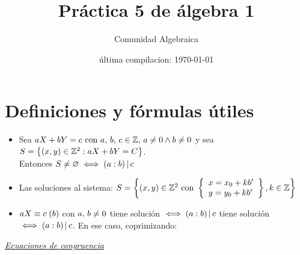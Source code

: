 




\title{Práctica 5 de álgebra 1} %
\author{Comunidad Algebraica} %
\date{última compilacion: \today} %

\maketitle  %

\section{Definiciones y fórmulas útiles}

\def\mcd{(a:b)}

\begin{itemize}
	\item Sea $aX + bY = c \text{ con } a,\, b,\, c \en \enteros,\, a \distinto 0 \y b \distinto 0$ y sea
	      $S = \set{ (x,y) \en \enteros^2 : aX + bY = C }$.\\
	      Entonces $S \distinto \vacio \sisolosi (a:b) \divideA c$

	\item Las soluciones al sistema: $S = \set{(x,y) \en \enteros^2 \text{ con }
			      \llaves{l}{
				      x = x_0 + kb'\\
				      y = y_0 + kb'
			      }
			      , k \en \enteros}
	      $

	\item $\congruencia{aX}{c}{b}$ con $ a,\, b \distinto 0$ tiene solución $\sisolosi \mcd \divideA c$ tiene solución $\sisolosi \mcd \divideA c$. En ese caso, coprimizando:
\end{itemize}

\textit\underline{Ecuaciones de congruencia}

